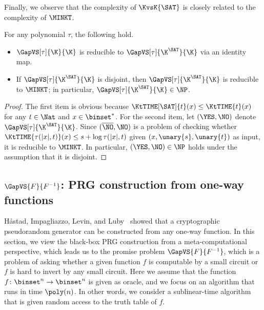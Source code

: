 \documentclass{toc}
\begin{document}
Finally, we observe that the complexity of $\KvsK{\SAT}$
is closely related to the complexity of $\MINKT$.
\begin{proposition}
  For any polynomial $\tau$, the following hold.
  \begin{itemize}
    \item
          $\GapVS[\tau]{\K}{\K}$ is reducible to $\GapVS[\tau]{\K^\SAT}{\K}$ via an identity map.
    \item
          If $\GapVS[\tau]{\K^\SAT}{\K}$ is disjoint,
          then
          $\GapVS[\tau]{\K^\SAT}{\K}$ is reducible to
          $\MINKT$; in particular,
          $\GapVS[\tau]{\K^\SAT}{\K} \in \NP$.
  \end{itemize}
\end{proposition}

\begin{proof}
  The first item is obvious because $\KtTIME[\SAT]{t}(x) \le \KtTIME{t}(x)$ for any $t \in \Nat$ and $x \in \binset^*$.
  For the second item,
  let $(\YES, \NO)$ denote
  $\GapVS[\tau]{\K^\SAT}{\K}$.
  Since $(\overline{\NO}, \NO)$ is a problem of checking whether $\KtTIME{\tau(|x|, t)}(x) \le s + \log \tau(|x|, t)$
  given $(x, \unary{s}, \unary{t})$ as input,
  it is reducible to $\MINKT$.
  In particular, $(\YES, \NO) \in \NP$ holds under the assumption that it is disjoint.
\end{proof}


\subsection{\texorpdfstring{$\GapVS{F}{F^{-1}}$}{Gap(F vs F(-1))}: PRG construction from one-way functions}
\label{section_HILL}
H{\aa}stad, Impagliazzo, Levin, and Luby~\cite{HastadILL99_siamcomp_journals}
showed that
a cryptographic pseudorandom generator can be constructed from any one-way function.
In this section, we view the black-box PRG construction from a meta-computational perspective,
which leads us to
the promise problem
$\GapVS{F}{F^{-1}}$,
which is a problem of asking whether a given function $f$ is
computable by a small circuit
or
$f$ is hard to invert by any small circuit.
Here we assume that the function $f \colon \binset^n \to \binset^n$ is given as oracle,
and we focus on an algorithm that runs in time $\poly(n)$.
In other words, we consider a sublinear-time algorithm that is given random access to the truth table of $f$.
%
\end{document}
